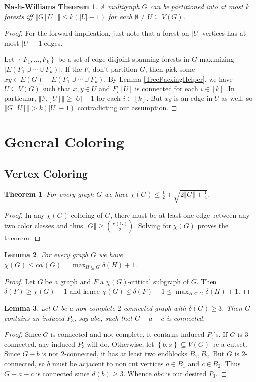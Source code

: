 \documentclass[12pt]{article}
\theoremstyle{plain}
\newtheorem{thm}{Theorem}
\newtheorem{lem}[thm]{Lemma}
\newtheorem*{NashWilliams}{Nash-Williams Theorem}
\theoremstyle{definition}
\theoremstyle{remark}
\newcommand{\set}[1]{\left\{ #1 \right\}}
\newcommand{\card}[1]{\left|#1\right|}
\newcommand{\size}[1]{\left\Vert#1\right\Vert}
\begin{document}
\begin{NashWilliams}
A multigraph $G$ can be partitioned into at most $k$ forests iff $\size{G[U]} \leq k(\card{U} - 1)$ for each $\emptyset \neq U \subseteq V(G)$.
\end{NashWilliams}
\begin{proof}
For the forward implication, just note that a forest on $\card{U}$ vertices has at most $\card{U} - 1$ edges.

Let $\set{F_1, \ldots, F_k}$ be a set of edge-disjoint spanning forests in $G$ maximizing $\card{E(F_1 \cup \cdots \cup F_k)}$.  If the $F_i$ don't partition $G$, then pick some $xy \in E(G) - E(F_1 \cup \cdots \cup F_k)$.  By Lemma \ref{TreePackingHelper}, we have $U \subseteq V(G)$ such that $x,y \in U$ and $F_i[U]$ is connected for each $i \in [k]$.  In particular, $\size{F_i[U]} \geq \card{U} - 1$ for each $i \in [k]$. But $xy$ is an edge in $U$ as well, so $\size{G[U]} > k(\card{U} - 1)$ contradicting our assumption.
\end{proof}

\section{General Coloring}
\subsection{Vertex Coloring}
\begin{thm}
For every graph $G$ we have $\chi(G) \leq \frac12 + \sqrt{2\size{G} + \frac14}$.
\end{thm}
\begin{proof}
In any $\chi(G)$ coloring of $G$, there must be at least one edge between any two color classes and thus $\size{G} \geq {\chi(G) \choose 2}$.  Solving for $\chi(G)$ proves the theorem.
\end{proof}

\begin{lem}
For every graph $G$ we have $\chi(G) \leq col(G) = \max_{H \subseteq G} \delta(H) + 1$.
\end{lem}
\begin{proof}
Let $G$ be a graph and $F$ a $\chi(G)$-critical subgraph of $G$.  Then $\delta(F) \geq \chi(G) - 1$ and hence $\chi(G) \leq \delta(F) + 1 \leq  \max_{H \subseteq G} \delta(H) + 1$.
\end{proof}

\begin{lem}\label{TwoConnectedHasGoodP3}
Let $G$ be a non-complete $2$-connected graph with $\delta(G) \geq 3$. Then $G$ contains an induced $P_3$, say $abc$, such that $G - a - c$ is connected.
\end{lem}
\begin{proof}
Since $G$ is connected and not complete, it contains induced $P_3$'s. If $G$ is $3$-connected, any induced $P_3$ will do.  Otherwise, let $\set{b, x} \subseteq V(G)$ be a cutset.  Since $G - b$ is not $2$-connected, it has at least two endblocks $B_1, B_2$.  But $G$ is $2$-connected, so $b$ must be adjacent to non cut vertices $a \in B_1$ and $c \in B_2$.  Thus $G - a - c$ is connected since $d(b) \geq 3$.  Whence $abc$ is our desired $P_3$.
\end{proof}
\end{document}
